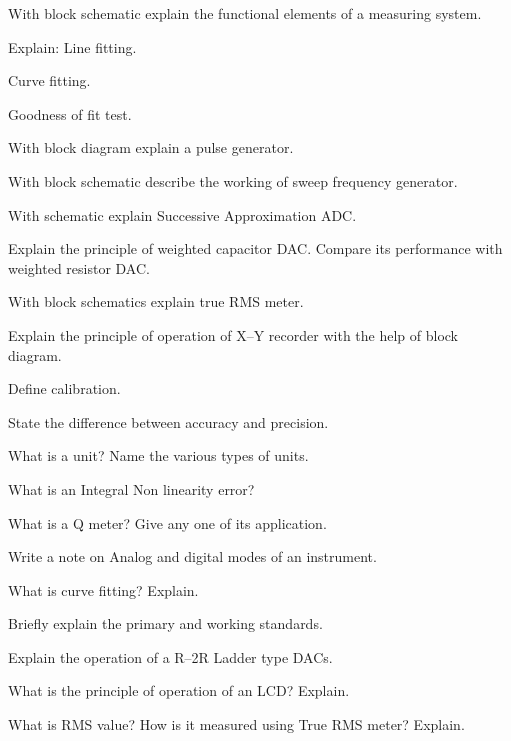 \item
\iitem With block schematic explain the functional elements of a measuring system.
\Or
\item Explain:
\iitem Line fitting.
\item Curve fitting.
\item Goodness of fit test.
\ene
\ene

\item 
\iitem With block diagram explain a pulse generator.
\Or
\item With block schematic describe the working of sweep frequency generator.
\ene

\item
\iitem With schematic explain Successive Approximation ADC.
\Or
\item Explain the principle of weighted capacitor DAC. Compare its performance with weighted resistor DAC.
\ene

\item
\iitem With block schematics explain true RMS meter.
\Or
\item Explain the principle of operation of X--Y recorder with the help of block diagram.
\ene

\markC
\ene

\newpage

\sub{\subj}
\maxtime

\partA

\iitem Define calibration.
\item State the difference between accuracy and precision.
\item What is a unit? Name the various types of units.
\item What is an Integral Non linearity error?
\item What is a Q meter? Give any one of its application.

\markA
\partB

\item Write a note on Analog and digital modes of an instrument.
\item What is curve fitting? Explain.
\item Briefly explain the primary and working standards.
\item Explain the operation of a R--2R Ladder type DACs.
\item What is the principle of operation of an LCD? Explain.
\item What is RMS value? How is it measured using True RMS meter? Explain.

